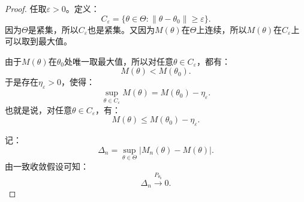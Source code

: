 \begin{proof}
	任取$\varepsilon>0$。定义：
	\begin{equation*}
		C_\varepsilon
		=
		\{\theta\in\Theta:\|\theta-\theta_0\|\geqslant \varepsilon\}.
	\end{equation*}
	因为$\Theta$是紧集，所以$C_\varepsilon$也是紧集。又因为$M(\theta)$在$\Theta$上连续，所以$M(\theta)$在$C_\varepsilon$上可以取到最大值。
	
	由于$M(\theta)$在$\theta_0$处唯一取最大值，所以对任意$\theta\in C_\varepsilon$，都有：
	\begin{equation*}
		M(\theta)<M(\theta_0).
	\end{equation*}
	于是存在$\eta_\varepsilon>0$，使得：
	\begin{equation*}
		\sup_{\theta\in C_\varepsilon}M(\theta)
		=
		M(\theta_0)-\eta_\varepsilon.
	\end{equation*}
	也就是说，对任意$\theta\in C_\varepsilon$，有：
	\begin{equation*}
		M(\theta)
		\leqslant
		M(\theta_0)-\eta_\varepsilon.
	\end{equation*}
	
	记：
	\begin{equation*}
		\Delta_n
		=
		\sup_{\theta\in\Theta}
		\left|
		M_n(\theta)-M(\theta)
		\right|.
	\end{equation*}
	由一致收敛假设可知：
	\begin{equation*}
		\Delta_n\xrightarrow{P_{\theta_0}}0.
	\end{equation*}
	

\end{proof}
